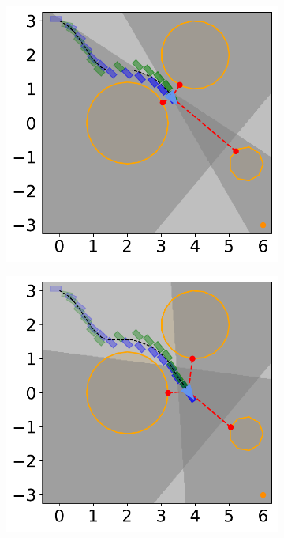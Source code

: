 \begin{figure}[H]
    \begin{subfigure}{0.35\textwidth}
        \centering
        \includegraphics[width=\textwidth]{figures/Simulations/sim1circles_delta/frame_4.pdf}
    \end{subfigure}
    \hfil
    \begin{subfigure}{0.35\textwidth}
        \centering
        \includegraphics[width=\textwidth]{figures/Simulations/sim1circles_delta/frame_5.pdf}
    \end{subfigure}%
    

\end{figure}
